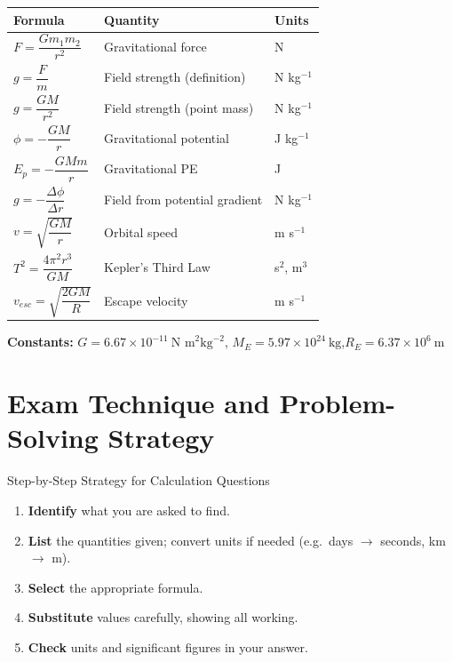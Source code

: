 \begin{minipage}{\linewidth}
\begin{tcolorbox}[colback=lightgold, colframe=accentgold]
\renewcommand{\arraystretch}{1.8}
\begin{tabular}{@{}lll@{}}
\toprule
\textbf{Formula} & \textbf{Quantity} & \textbf{Units} \\
\midrule
$F = \dfrac{Gm_1 m_2}{r^2}$ & Gravitational force & N \\
$g = \dfrac{F}{m}$ & Field strength (definition) & N kg$^{-1}$ \\
$g = \dfrac{GM}{r^2}$ & Field strength (point mass) & N kg$^{-1}$ \\
$\phi = -\dfrac{GM}{r}$ & Gravitational potential & J kg$^{-1}$ \\
$E_p = -\dfrac{GMm}{r}$ & Gravitational PE & J \\
$g = -\dfrac{\Delta\phi}{\Delta r}$ & Field from potential gradient & N kg$^{-1}$ \\
$v = \sqrt{\dfrac{GM}{r}}$ & Orbital speed & m s$^{-1}$ \\
$T^2 = \dfrac{4\pi^2 r^3}{GM}$ & Kepler's Third Law & s$^2$, m$^3$ \\
$v_{esc} = \sqrt{\dfrac{2GM}{R}}$ & Escape velocity & m s$^{-1}$ \\
\bottomrule
\end{tabular}
\end{tcolorbox}

\vspace{0.5em}
\begin{tcolorbox}[colback=lightblue, colframe=darkblue]
\textbf{Constants:} $G = 6.67\times10^{-11}\ \text{N m}^2\text{kg}^{-2}$,\quad
$M_E = 5.97\times10^{24}\ \text{kg}$,\quad $R_E = 6.37\times10^6\ \text{m}$
\end{tcolorbox}
\end{minipage}

\section{Exam Technique and Problem-Solving Strategy}

\begin{keybox}{Step-by-Step Strategy for Calculation Questions}
\begin{enumerate}[itemsep=3pt]
  \item \textbf{Identify} what you are asked to find.
  \item \textbf{List} the quantities given; convert units if needed (e.g.\ days $\to$ seconds, km $\to$ m).
  \item \textbf{Select} the appropriate formula.
  \item \textbf{Substitute} values carefully, showing all working.
  \item \textbf{Check} units and significant figures in your answer.
\end{enumerate}
\end{keybox}


